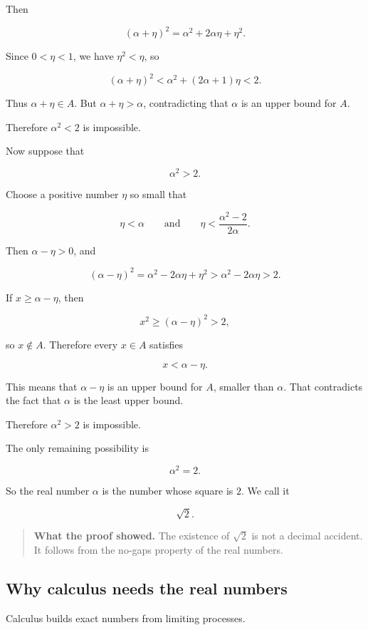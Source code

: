 Then

\[
(\alpha+\eta)^2
=
\alpha^2+2\alpha\eta+\eta^2.
\]

Since \(0<\eta<1\), we have \(\eta^2<\eta\), so

\[
(\alpha+\eta)^2
<
\alpha^2+(2\alpha+1)\eta
<
2.
\]

Thus \(\alpha+\eta\in A\). But \(\alpha+\eta>\alpha\), contradicting that \(\alpha\) is an upper bound for \(A\).

Therefore \(\alpha^2<2\) is impossible.

Now suppose that

\[
\alpha^2>2.
\]

Choose a positive number \(\eta\) so small that

\[
\eta<\alpha
\qquad\text{and}\qquad
\eta<\frac{\alpha^2-2}{2\alpha}.
\]

Then \(\alpha-\eta>0\), and

\[
(\alpha-\eta)^2
=
\alpha^2-2\alpha\eta+\eta^2
>
\alpha^2-2\alpha\eta
>
2.
\]

If \(x\ge \alpha-\eta\), then

\[
x^2\ge(\alpha-\eta)^2>2,
\]

so \(x\notin A\). Therefore every \(x\in A\) satisfies

\[
x<\alpha-\eta.
\]

This means that \(\alpha-\eta\) is an upper bound for \(A\), smaller than \(\alpha\). That contradicts the fact that \(\alpha\) is the least upper bound.

Therefore \(\alpha^2>2\) is impossible.

The only remaining possibility is

\[
\alpha^2=2.
\]

So the real number \(\alpha\) is the number whose square is \(2\). We call it

\[
\sqrt2.
\]

\begin{quote}
\textbf{What the proof showed.}
The existence of \(\sqrt2\) is not a decimal accident. It follows from the no-gaps property of the real numbers.
\end{quote}

\subsection{Why calculus needs the real numbers}
\label{subsec:why-calculus-needs-reals}

Calculus builds exact numbers from limiting processes.

